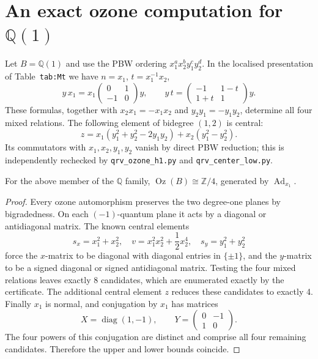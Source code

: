 \section{An exact ozone computation for $\mathbb Q(1)$}
Let $B=\mathbb Q(1)$ and use the PBW ordering
$x_1^a x_2^b y_1^c y_2^d$. In the localised presentation of
Table~\texttt{tab:Mt} we have $n=x_1$, $t=x_1^{-1}x_2$,
\[
 y\,x_1=x_1\begin{pmatrix}0&1\\-1&0\end{pmatrix}y,
 \qquad y\,t=\begin{pmatrix}-1&1-t\\1+t&1\end{pmatrix}y.
\]
These formulas, together with $x_2x_1=-x_1x_2$ and
$y_2y_1=-y_1y_2$, determine all four mixed relations.
The following element of bidegree $(1,2)$ is central:
\[
 z=x_1(y_1^2+y_2^2-2y_1y_2)+x_2(y_1^2-y_2^2).
\]
Its commutators with $x_1,x_2,y_1,y_2$ vanish by direct PBW
reduction; this is independently rechecked by
\texttt{qrv\_ozone\_h1.py} and \texttt{qrv\_center\_low.py}.

\begin{proposition}
For the above member of the $\mathbb Q$ family,
$\operatorname{Oz}(B)\cong\mathbb Z/4$, generated by
$\operatorname{Ad}_{x_1}$.
\end{proposition}
\begin{proof}
Every ozone automorphism preserves the two degree-one planes by
bigradedness. On each $(-1)$-quantum plane it acts by a diagonal or
antidiagonal matrix. The known central elements
\[
 s_x=x_1^2+x_2^2,\quad
 v=x_1^2x_2^2+\frac12x_2^4,\quad
 s_y=y_1^2+y_2^2
\]
force the $x$-matrix to be diagonal with diagonal entries in
$\{\pm1\}$, and the $y$-matrix to be a signed diagonal or signed
antidiagonal matrix. Testing the four mixed relations leaves exactly
8 candidates, which are enumerated exactly by the certificate.
The additional central element $z$ reduces these candidates to exactly
4. Finally $x_1$ is normal, and conjugation by $x_1$ has matrices
\[
 X=\operatorname{diag}(1,-1),\qquad
 Y=\begin{pmatrix}0&-1\\1&0\end{pmatrix}.
\]
The four powers of this conjugation are distinct and comprise all four
remaining candidates. Therefore the upper and lower bounds coincide.
\end{proof}

